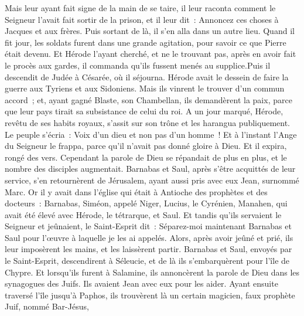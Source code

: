 \begin{multicols}{2}
Mais leur ayant fait signe de la main de se taire, il leur raconta comment le Seigneur l'avait fait sortir de la prison, et il leur dit~: Annoncez ces choses à Jacques et aux frères. Puis sortant de là, il s'en alla dans un autre lieu.
Quand il fit jour, les soldats furent dans une grande agitation, pour savoir ce que Pierre était devenu.
Et Hérode l'ayant cherché, et ne le trouvant pas, après en avoir fait le procès aux gardes, il commanda qu'ils fussent menés au supplice.Puis il descendit de Judée à Césarée, où il séjourna.
Hérode avait le dessein de faire la guerre aux Tyriens et aux Sidoniens. Mais ils vinrent le trouver d'un commun accord~; et, ayant gagné Blaste, son Chambellan, ils demandèrent la paix, parce que leur pays tirait sa subsistance de celui du roi.
A un jour marqué, Hérode, revêtu de ses habits royaux, s'assit sur son trône et les harangua publiquement.
Le peuple s'écria~: Voix d'un dieu et non pas d'un homme~!
Et à l'instant l'Ange du Seigneur le frappa, parce qu'il n'avait pas donné gloire à Dieu. Et il expira, rongé des vers.
Cependant la parole de Dieu se répandait de plus en plus, et le nombre des disciples augmentait.
Barnabas et Saul, après s'être acquittés de leur service, s'en retournèrent de Jérusalem, ayant aussi pris avec eux Jean, surnommé Marc.
\VerseOne{}Or il y avait dans l'église qui était à Antioche des prophètes et des docteurs~: Barnabas, Siméon, appelé Niger, Lucius, le Cyrénien, Manahen, qui avait été élevé avec Hérode, le tétrarque, et Saul.
Et tandis qu'ils servaient le Seigneur et jeûnaient, le Saint-Esprit dit~: Séparez-moi maintenant Barnabas et Saul pour l'œuvre à laquelle je les ai appelés.
Alors, après avoir jeûné et prié, ils leur imposèrent les mains, et les laissèrent partir.
Barnabas et Saul, envoyés par le Saint-Esprit, descendirent à Séleucie, et de là ils s'embarquèrent pour l'île de Chypre.
Et lorsqu'ils furent à Salamine, ils annoncèrent la parole de Dieu dans les synagogues des Juifs. Ils avaient Jean avec eux pour les aider.
Ayant ensuite traversé l'île jusqu'à Paphos, ils trouvèrent là un certain magicien, faux prophète Juif, nommé Bar-Jésus,

\end{multicols}
